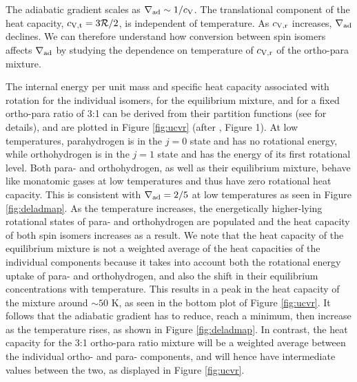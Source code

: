 The adiabatic gradient scales as $\nabla_{\rm ad} \sim 1/c_{\rm V}$.
The translational component of the heat capacity, $c_{\rm V, t}=3\mathcal{R}/2$, is independent of temperature.  As $c_{\rm V,r}$ increases, $\nabla_{\rm ad}$ declines. We can therefore understand how conversion between spin isomers affects $\nabla_{\rm ad}$ by studying the dependence on temperature of $c_{\rm V, r}$ of the ortho-para mixture. 



The internal energy per unit mass and specific heat capacity associated with rotation for the individual isomers, for the equilibrium mixture, and for a fixed ortho-para ratio of 3:1 can be derived from their partition functions (see  for details), and are plotted in Figure  \ref{fig:ucvr} (after \citealt{farkas35}, Figure 1). At low temperatures, parahydrogen is in the $j=0$ state and has no rotational energy, while orthohydrogen is in the $j=1$ state and has the energy of its first rotational level. Both para- and orthohydrogen, as well as their equilibrium mixture, behave like monatomic gases at low temperatures and thus have zero rotational heat capacity. This is consistent with $\nabla_{\rm ad}=2/5$ at low temperatures as seen in Figure \ref{fig:deladmap}. As the temperature increases, the energetically higher-lying rotational states of para- and orthohydrogen are populated and the heat capacity of both spin isomers increases as a result. We note that the heat capacity of the equilibrium mixture is not a weighted average of the heat capacities of the individual components because it takes into account both the rotational energy uptake of para- and orthohydrogen, and also the shift in their equilibrium concentrations with temperature. This results in a peak in the heat capacity of the mixture around $\sim$$50$ K, as seen in the bottom plot of Figure \ref{fig:ucvr}. It follows that the adiabatic gradient has to reduce, reach a minimum, then increase as the temperature rises, as shown in Figure \ref{fig:deladmap}. In contrast, the heat capacity for the 3:1 ortho-para ratio mixture will be a weighted average between the individual ortho- and para- components, and will hence have intermediate values between the two, as displayed in Figure \ref{fig:ucvr}.

